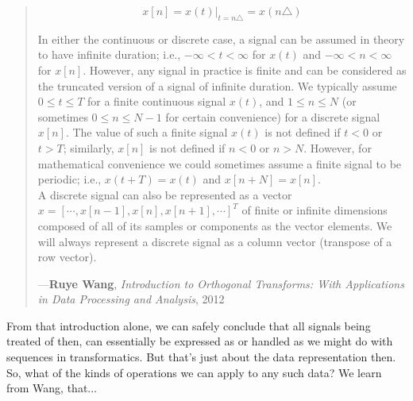 \documentclass[a4paper, 18pt]{book} %
\begin{document}
\begin{appendices}
\begin{minipage}{1\textwidth}
\begin{quotation}
{\begin{equation}
x[n] = x(t)|_{t=n\triangle} = x(n\triangle)
\end{equation}

\vspace{1em}

In either the continuous or discrete case, a signal can be assumed in theory to
have infinite duration; i.e., $-\infty < t < \infty$ for $x(t)$ and $-\infty < n < \infty$ for $x[n]$. However, any signal in practice is finite and can be considered as the truncated
version of a signal of infinite duration. We typically assume $0 \leq t \leq T$ for a finite
continuous signal $x(t)$, and $1 \leq n \leq N$ (or sometimes $0 \leq n \leq N - 1$ for certain
convenience) for a discrete signal $x[n]$. The value of such a finite signal $x(t)$ is not
defined if $t < 0$ or $t > T$; similarly, $x[n]$ is not defined if $n < 0$ or $n > N$. However,
for mathematical convenience we could sometimes assume a finite signal to be
periodic; i.e., $x(t + T) = x(t)$ and $x[n + N] = x[n]$.\\


A discrete signal can also be represented as a vector $x = [\cdots ,x[n -
1], x[n], x[n + 1], \cdots]^T$ of finite or infinite dimensions composed of all of its samples
or components as the vector elements. We will always represent a discrete
signal as a column vector (transpose of a row vector).

}
\hspace*{\fill} ---\textbf{Ruye Wang}, \textit{Introduction to Orthogonal Transforms: With Applications in Data Processing and Analysis}, 2012\cite{Wang2012}
\end{quotation}
\vspace{1em}
\end{minipage}

\vspace{2em}


From that introduction alone, we can safely conclude that all signals being treated of then, can essentially be expressed as or handled as we might do with sequences in transformatics. But that's just about the data representation then. So, what of the kinds of operations we can apply to any such data? We learn from Wang, that...\\


\noindent
\begin{minipage}{1\textwidth}
\vspace{1em}
\begin{quotation}
{\ttfamily

}
\end{quotation}
\end{minipage}
\end{appendices}
\end{document}

